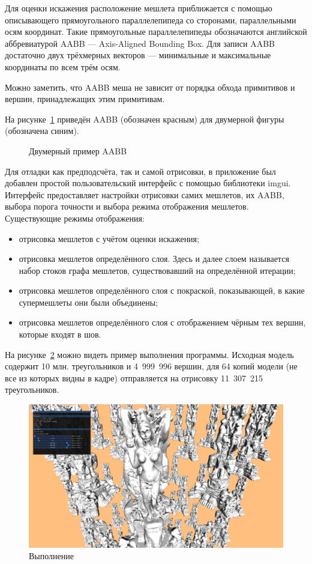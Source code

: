 Для оценки искажения расположение мешлета приближается с помощью описывающего прямоугольного параллелепипеда со сторонами, параллельными осям координат.
Такие прямоугольные параллелепипеды обозначаются английской аббревиатурой AABB --- Axis-Aligned Bounding Box.
Для записи AABB достаточно двух трёхмерных векторов --- минимальные и максимальные координаты по всем трём осям.

Можно заметить, что AABB меша не зависит от порядка обхода примитивов и вершин, принадлежащих этим примитивам.

На рисунке~\ref{fig:AABB} приведён AABB (обозначен красным) для двумерной фигуры (обозначена синим).

\begin{figure}[h]
    \centering
    \caption{Двумерный пример AABB}
    \label{fig:AABB}
\end{figure}

Для отладки как предподсчёта, так и самой отрисовки, в приложение был добавлен простой пользовательский интерфейс с помощью библиотеки imgui.
Интерфейс предоставляет настройки отрисовки самих мешлетов, их AABB, выбора порога точности и выбора режима отображения мешлетов.
Существующие режимы отображения:
\begin{itemize}
    \item отрисовка мешлетов с учётом оценки искажения;
    \item отрисовка мешлетов определённого слоя.
    Здесь и далее слоем называется набор стоков графа мешлетов, существовавший на определённой итерации;
    \item отрисовка мешлетов определённого слоя с покраской, показывающей, в какие супермешлеты они были объединены;
    \item отрисовка мешлетов определённого слоя с отображением чёрным тех вершин, которые входят в шов.
\end{itemize}

На рисунке~\ref{fig:execution-example} можно видеть пример выполнения программы.
Исходная модель содержит 10 млн. треугольников и 4~999~996 вершин, для 64 копий модели (не все из которых видны в кадре) отправляется на отрисовку 11~307~215 треугольников.

\begin{figure}[h]
    \includegraphics[width=\textwidth]{impl2.png}
    \caption{Выполнение }
    \label{fig:execution-example}
\end{figure}
